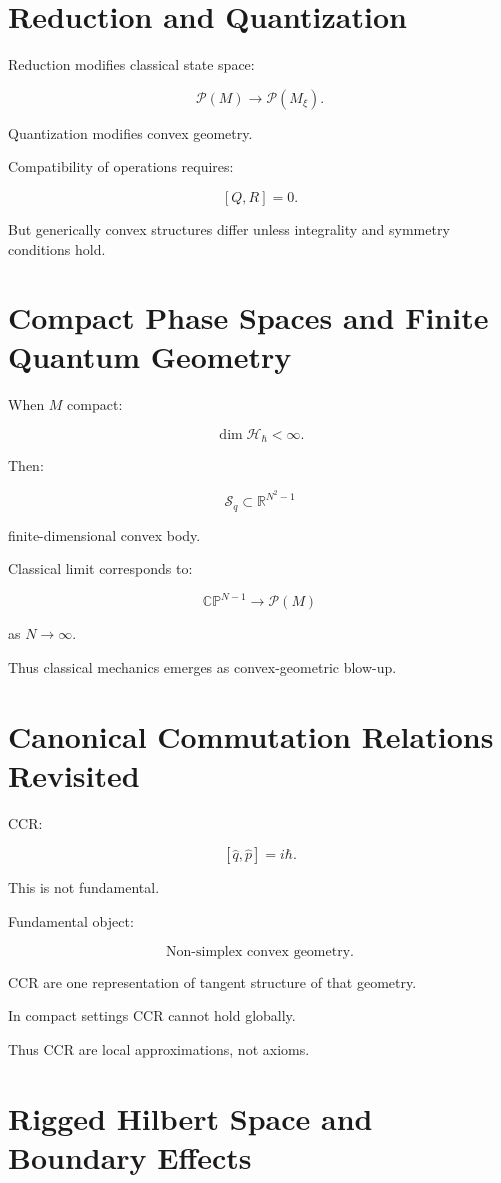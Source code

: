 \documentclass[11pt]{book}
\begin{document}
\section{Reduction and Quantization}

Reduction modifies classical state space:

\[
\mathcal{P}(M)
\to
\mathcal{P}(M_\xi).
\]

Quantization modifies convex geometry.

Compatibility of operations requires:

\[
[Q,R]=0.
\]

But generically convex structures differ unless integrality and symmetry conditions hold.

\section{Compact Phase Spaces and Finite Quantum Geometry}

When $M$ compact:

\[
\dim \mathcal{H}_\hbar < \infty.
\]

Then:

\[
\mathcal{S}_q \subset \mathbb{R}^{N^2-1}
\]

finite-dimensional convex body.

Classical limit corresponds to:

\[
\mathbb{CP}^{N-1}
\to
\mathcal{P}(M)
\]

as $N\to\infty$.

Thus classical mechanics emerges as convex-geometric blow-up.

\section{Canonical Commutation Relations Revisited}

CCR:

\[
[\hat q, \hat p] = i\hbar.
\]

This is not fundamental.

Fundamental object:

\[
\text{Non-simplex convex geometry}.
\]

CCR are one representation of tangent structure of that geometry.

In compact settings CCR cannot hold globally.

Thus CCR are local approximations, not axioms.

\section{Rigged Hilbert Space and Boundary Effects}
\end{document}

